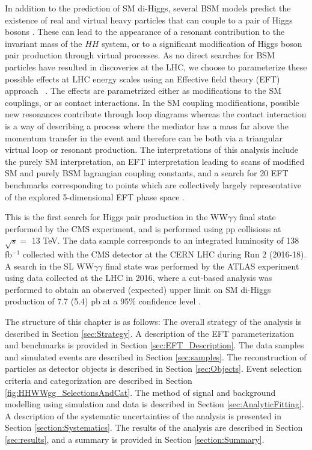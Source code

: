 In addition to the prediction of SM di-Higgs, several BSM models predict the existence of real and virtual heavy particles that can couple to a pair of Higgs bosons \cite{deFlorian:2016spz, Nakamura:2017irk, Englert:2019eyl, Robens:2019kga, Tang:2012pv}.
These can lead to the appearance of a resonant contribution to the invariant mass of the $HH$ system, or to a significant modification of Higgs boson pair production through virtual processes. As no direct searches for BSM particles have resulted in discoveries at the LHC, we choose to parameterize 
these possible effects at LHC energy scales using an Effective field theory (EFT) approach ~\cite{deFlorian:2016spz, Carvalho:2015ttv}. The effects are parametrized either as modifications to the SM couplings, 
or as contact interactions. In the SM coupling modifications, possible new resonances contribute through loop diagrams whereas the contact interaction is a way of 
describing a process where the mediator has a mass far above the momentum transfer in the event and therefore can be both via a triangular virtual loop or resonant production. 
The interpretations of this analysis include the purely SM interpretation, an EFT interpretation leading to scans of modified SM and purely BSM lagrangian coupling constants, 
and a search for 20 EFT benchmarks corresponding to points which are collectively largely representative of the explored 5-dimensional EFT phase space \cite{Carvalho:2015ttv,Buchalla:2018yce,Capozi:2019xsi}.  

This is the first search for Higgs pair production in the WW$\gamma\gamma$ final state performed by the CMS experiment, and is performed using pp collisions at $\sqrt{s} = $ 13 TeV.
The data sample corresponds to an integrated luminosity of 138 \unit{fb}$^{-1}$ collected with the CMS detector at the CERN LHC during Run 2 (2016-18).
A search in the SL WW$\gamma\gamma$ final state was performed 
by the ATLAS experiment using data collected at the LHC in 2016, where a cut-based analysis was performed to obtain an observed (expected) upper limit on SM di-Higgs
production of 7.7 (5.4) pb at a 95\% confidence level \cite{Aaboud2018}. 

The structure of this chapter is as follows: The overall strategy of the analysis is described in Section \ref{sec:Strategy}. A description of the EFT parameterization and
benchmarks is provided in Section \ref{sec:EFT_Description}. The data samples and simulated events are described in Section \ref{sec:samples}. 
The reconstruction of particles as detector objects is described in Section \ref{sec:Objects}. Event selection criteria and categorization are described in Section \ref{fig:HHWWgg_SelectionsAndCat}. 
The method of signal and background modelling using simulation and data is
described in Section \ref{sec:AnalyticFitting}. A description of the systematic uncertainties of the analysis is presented in Section \ref{section:Systematics}.
The results of the analysis are described in Section \ref{sec:results}, and a summary is provided in Section \ref{section:Summary}. 

